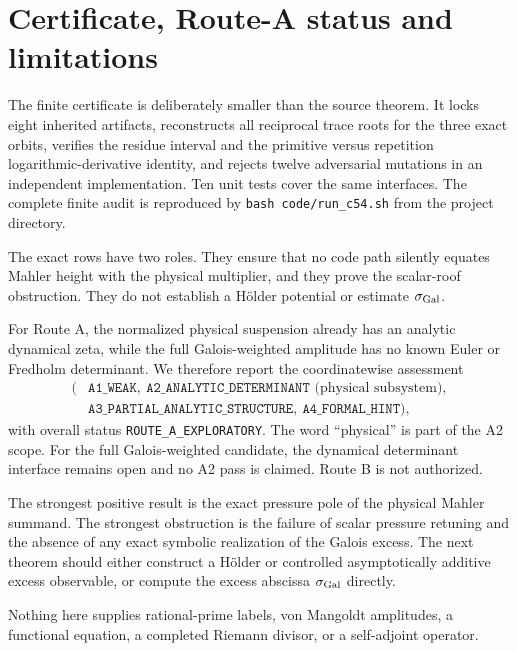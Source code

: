 \section{Certificate, Route-A status and limitations}

The finite certificate is deliberately smaller than the source theorem.  It
locks eight inherited artifacts, reconstructs all reciprocal trace roots for
the three exact orbits, verifies the residue interval and the primitive versus
repetition logarithmic-derivative identity, and rejects twelve adversarial
mutations in an independent implementation.  Ten unit tests cover the same
interfaces.  The complete finite audit is reproduced by
\texttt{bash code/run\_c54.sh} from the project directory.

The exact rows have two roles.  They ensure that no code path silently equates
Mahler height with the physical multiplier, and they prove the scalar-roof
obstruction.  They do not establish a H\"older potential or estimate
\(\sigma_{\rm Gal}\).

For Route A, the normalized physical suspension already has an analytic
dynamical zeta, while the full Galois-weighted amplitude has no known Euler or
Fredholm determinant.  We therefore report the coordinatewise assessment
\[
\begin{aligned}
(&\texttt{A1\_WEAK},
\ \texttt{A2\_ANALYTIC\_DETERMINANT}
   \text{ (physical subsystem)},\\
 &\texttt{A3\_PARTIAL\_ANALYTIC\_STRUCTURE},
\ \texttt{A4\_FORMAL\_HINT}),
\end{aligned}
\]
with overall status \texttt{ROUTE\_A\_EXPLORATORY}.  The word ``physical'' is
part of the A2 scope.  For the full Galois-weighted candidate, the dynamical
determinant interface remains open and no A2 pass is claimed.
Route B is not authorized.

The strongest positive result is the exact pressure pole of the physical
Mahler summand.  The strongest obstruction is the failure of scalar pressure
retuning and the absence of any exact symbolic realization of the Galois
excess.  The next theorem should either construct a H\"older or controlled
asymptotically additive excess observable, or compute the excess abscissa
\(\sigma_{\rm Gal}\) directly.

Nothing here supplies rational-prime labels, von Mangoldt amplitudes, a
functional equation, a completed Riemann divisor, or a self-adjoint operator.
